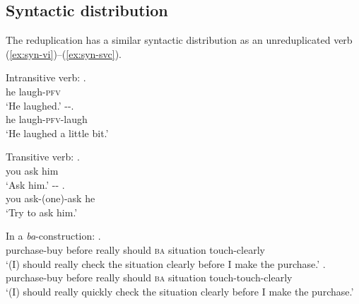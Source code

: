 \subsection{Syntactic distribution}\label{sec:syn-dis}

The reduplication has a similar syntactic distribution as an unreduplicated verb (\ref{ex:syn-vi})--(\ref{ex:syn-svc}). 


\settowidth{}
\begin{sloppypar}
\ea\label{ex:syn-vi} Intransitive verb:
		\ea \gll {} .\\
		he laugh-\textsc{pfv}\\
		\glt `He laughed.'
		\ex\label{ex:xiaole} \gll {} --.\\
		he laugh-\textsc{pfv}-laugh\\
		\glt `He laughed a little bit.'
		\z
        
\ex Transitive verb:
		\ea \gll {}  .\\
		you ask him\\
		\glt `Ask him.'
		\ex \gll {} -- .\\
		you ask-(one)-ask he\\
		\glt `Try to ask him.'
		\z



\ex In a \textit{ba}-construction:
		\ea \gll {}      .\\
		purchase-buy before really should \textsc{ba} situation touch-clearly\\
		\glt `(I) should really check the situation clearly before I make the purchase.'
		\ex \gll {}      .\footnotemark\\
		purchase-buy before really should \textsc{ba} situation touch-touch-clearly\\ 
		\glt `(I) should really quickly check the situation clearly before I make the purchase.'
		\z
{}


\end{sloppypar}
